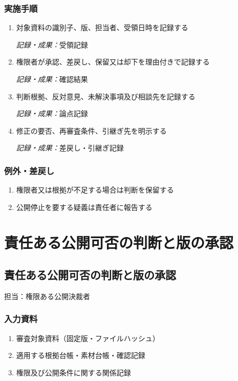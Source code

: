 \documentclass[a4paper,11pt]{article}
\begin{document}
\subsubsection*{実施手順}
\begin{enumerate}[leftmargin=2em,itemsep=0.65em]
\item 対象資料の識別子、版、担当者、受領日時を記録する\par\noindent\textit{記録・成果：}受領記録\nobreak\smallskip
\item 権限者が承認、差戻し、保留又は却下を理由付きで記録する\par\noindent\textit{記録・成果：}確認結果\nobreak\smallskip
\item 判断根拠、反対意見、未解決事項及び相談先を記録する\par\noindent\textit{記録・成果：}論点記録\nobreak\smallskip
\item 修正の要否、再審査条件、引継ぎ先を明示する\par\noindent\textit{記録・成果：}差戻し・引継ぎ記録\nobreak\smallskip
\end{enumerate}
\subsubsection*{例外・差戻し}
\begin{enumerate}[leftmargin=2em,itemsep=0.35em]
\item 権限者又は根拠が不足する場合は判断を保留する
\item 公開停止を要する疑義は責任者に報告する
\end{enumerate}
\section{責任ある公開可否の判断と版の承認}
\subsection{責任ある公開可否の判断と版の承認}
\par 担当：権限ある公開決裁者\par\medskip
\subsubsection*{入力資料}
\begin{enumerate}[leftmargin=2em,itemsep=0.35em]
\item 審査対象資料（固定版・ファイルハッシュ）
\item 適用する根拠台帳・素材台帳・確認記録
\item 権限及び公開条件に関する関係記録
\end{enumerate}
\end{document}
